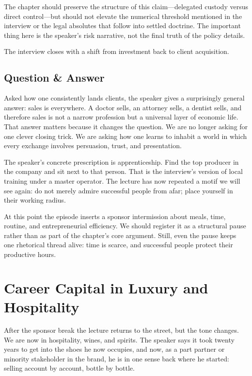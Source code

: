 \begin{remark}
The chapter should preserve the structure of this claim---delegated custody versus direct control---but should not elevate the numerical threshold mentioned in the interview or the legal absolutes that follow into settled doctrine. The important thing here is the speaker's risk narrative, not the final truth of the policy details.
\end{remark}

The interview closes with a shift from investment back to client acquisition.

\subsection{Question \& Answer}

Asked how one consistently lands clients, the speaker gives a surprisingly general answer: sales is everywhere. A doctor sells, an attorney sells, a dentist sells, and therefore sales is not a narrow profession but a universal layer of economic life. That answer matters because it changes the question. We are no longer asking for one clever closing trick. We are asking how one learns to inhabit a world in which every exchange involves persuasion, trust, and presentation.

The speaker's concrete prescription is apprenticeship. Find the top producer in the company and sit next to that person. That is the interview's version of local training under a master operator. The lecture has now repeated a motif we will see again: do not merely admire successful people from afar; place yourself in their working radius.

At this point the episode inserts a sponsor intermission about meals, time, routine, and entrepreneurial efficiency. We should register it as a structural pause rather than as part of the chapter's core argument. Still, even the pause keeps one rhetorical thread alive: time is scarce, and successful people protect their productive hours.

\section{Career Capital in Luxury and Hospitality}

After the sponsor break the lecture returns to the street, but the tone changes. We are now in hospitality, wines, and spirits. The speaker says it took twenty years to get into the shoes he now occupies, and now, as a part partner or minority stakeholder in the brand, he is in one sense back where he started: selling account by account, bottle by bottle.

